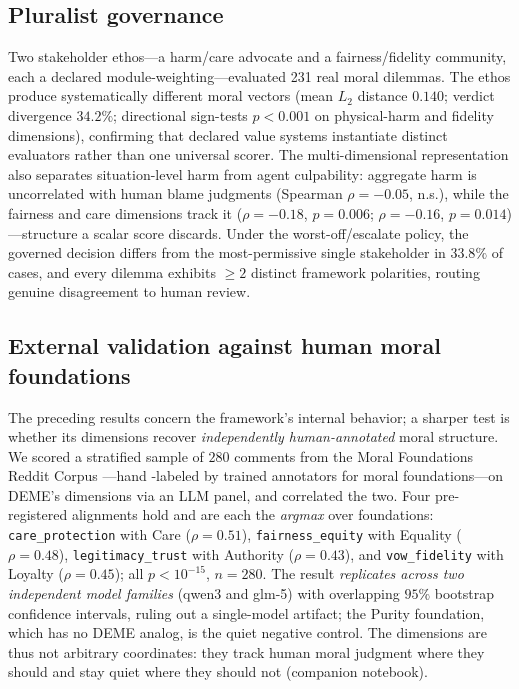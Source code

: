 \subsection{Pluralist governance}
Two stakeholder ethos---a harm/care advocate and a fairness/fidelity community, each a
declared module-weighting---evaluated 231 real moral dilemmas. The ethos produce
systematically different moral vectors (mean $L_2$ distance $0.140$; verdict divergence
$34.2\%$; directional sign-tests $p<0.001$ on physical-harm and fidelity dimensions),
confirming that declared value systems instantiate distinct evaluators rather than one
universal scorer. The multi-dimensional representation also separates situation-level harm
from agent culpability: aggregate harm is uncorrelated with human blame judgments
(Spearman $\rho=-0.05$, n.s.), while the fairness and care dimensions track it
($\rho=-0.18$, $p=0.006$; $\rho=-0.16$, $p=0.014$)---structure a scalar score discards. Under
the worst-off/escalate policy, the governed decision differs from the most-permissive single
stakeholder in $33.8\%$ of cases, and every dilemma exhibits $\geq 2$ distinct framework
polarities, routing genuine disagreement to human review.

\subsection{External validation against human moral foundations}
The preceding results concern the framework's internal behavior; a sharper test is whether its
dimensions recover \emph{independently human-annotated} moral structure. We scored a stratified
sample of $280$ comments from the Moral Foundations Reddit Corpus \citep{trager2022mfrc}---hand
-labeled by trained annotators for moral foundations---on DEME's dimensions via an LLM panel,
and correlated the two. Four pre-registered alignments hold and are each the \emph{argmax}
over foundations: \texttt{care\_protection} with Care ($\rho=0.51$), \texttt{fairness\_equity}
with Equality ($\rho=0.48$), \texttt{legitimacy\_trust} with Authority ($\rho=0.43$), and
\texttt{vow\_fidelity} with Loyalty ($\rho=0.45$); all $p<10^{-15}$, $n=280$. The result
\emph{replicates across two independent model families} (qwen3 and glm-5) with overlapping
$95\%$ bootstrap confidence intervals, ruling out a single-model artifact; the Purity
foundation, which has no DEME analog, is the quiet negative control. The dimensions are thus
not arbitrary coordinates: they track human moral judgment where they should and stay quiet
where they should not (companion notebook).

